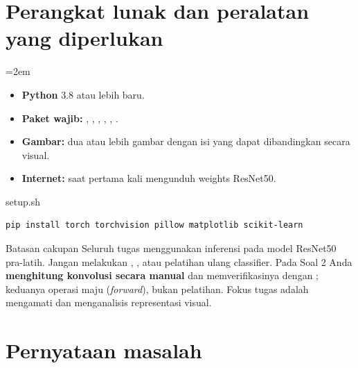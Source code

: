 \documentclass[12pt, a4paper]{article}
\begin{document}
\section{Perangkat lunak dan peralatan yang diperlukan}\label{sec:requiredsw}

{\emergencystretch=2em
\begin{itemize}[itemsep=2pt,parsep=0pt,topsep=2pt,partopsep=2pt]
  \item[\color{ctpBlue}\faPython] \textbf{Python} 3.8 atau lebih baru.
  \item[\color{ctpBlue}\faFileCode] \textbf{Paket wajib:} , , , , , .
  \item[\color{ctpBlue}\faImage] \textbf{Gambar:} dua atau lebih gambar dengan isi yang dapat dibandingkan secara visual.
  \item[\color{ctpBlue}\faDownload] \textbf{Internet:} saat pertama kali mengunduh weights ResNet50.
\end{itemize}}

\begin{codewindow}{setup.sh}
\begin{lstlisting}[style=pycode]
pip install torch torchvision pillow matplotlib scikit-learn
\end{lstlisting}
\end{codewindow}

\begin{minipage}{\linewidth}
\begin{bclogo}[couleur=ctpMantle, arrondi=0.1, logo=\bcinfo, ombre=false, couleurBord=ctpSurface, epBord=0.6]{Batasan cakupan}
  Seluruh tugas menggunakan inferensi pada model ResNet50 pra-latih. Jangan melakukan
  , , atau pelatihan ulang classifier. Pada Soal 2 Anda
  \textbf{menghitung konvolusi secara manual} dan memverifikasinya dengan
  ; keduanya operasi maju (\emph{forward}), bukan
  pelatihan. Fokus tugas adalah mengamati dan menganalisis representasi visual.
\end{bclogo}
\end{minipage}

\section{Pernyataan masalah}\label{sec:intro}
\end{document}
